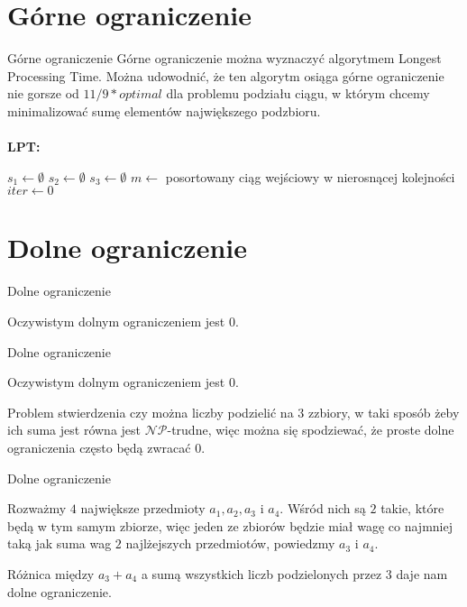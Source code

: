 \documentclass{beamer}
\begin{document}
\section{Górne ograniczenie}

\begin{frame}{Górne ograniczenie}
Górne ograniczenie można wyznaczyć algorytmem Longest Processing Time. Można udowodnić, że ten algorytm osiąga górne ograniczenie nie gorsze od $11/9*optimal$ dla problemu podziału ciągu, w którym chcemy minimalizować sumę elementów największego podzbioru.\\~\\
\textbf{LPT:}\\
\begin{algorithm}[H]
 $s_1 \gets \emptyset$\;
 $s_2 \gets \emptyset$\;
 $s_3 \gets \emptyset$\;
 $m \gets $ posortowany ciąg wejściowy w nierosnącej kolejności\;
 $iter \gets 0$\;
\end{algorithm} 

  

\end{frame}

\section{Dolne ograniczenie}

\begin{frame}[t]{Dolne ograniczenie}

Oczywistym dolnym ograniczeniem jest $0$.

\end{frame}

\begin{frame}[t]{Dolne ograniczenie}

Oczywistym dolnym ograniczeniem jest $0$.

Problem stwierdzenia czy można liczby podzielić na $3$ zzbiory, w taki sposób żeby ich suma jest równa jest $\mathcal{NP}$-trudne, więc można się spodziewać, że proste dolne ograniczenia często będą zwracać $0$.

\end{frame}

\begin{frame}[t]{Dolne ograniczenie}

Rozważmy $4$ największe przedmioty $a_1, a_2, a_3$ i $a_4$. Wśród nich są $2$ takie, które będą w tym samym zbiorze, więc jeden ze zbiorów będzie miał wagę co najmniej taką jak suma wag $2$ najlżejszych przedmiotów, powiedzmy $a_3$ i $a_4$.

Różnica między $a_3+a_4$ a sumą wszystkich liczb podzielonych przez $3$ daje nam dolne ograniczenie.

\end{frame}
\end{document}
